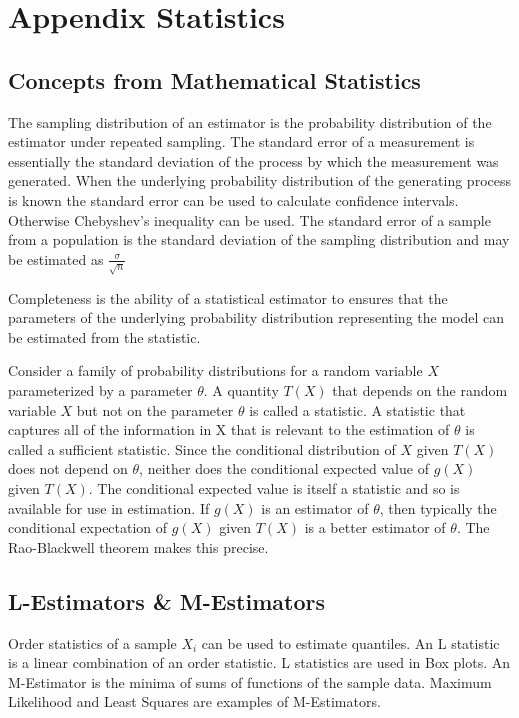 \chapter{Appendix Statistics}

\section*{Concepts from Mathematical Statistics}The sampling distribution of an estimator is the probability distribution of the estimator under repeated sampling.  The standard error of a measurement is essentially the standard deviation of the process by which the measurement was generated.  When the underlying probability distribution of the generating process is known the standard error can be used to calculate confidence intervals.  Otherwise Chebyshev's inequality can be used. The standard error of a sample from a population is the standard deviation of the sampling distribution and may be estimated as $\frac{\sigma}{\sqrt{n}}$

Completeness is the ability of a statistical estimator to ensures that the parameters of the underlying probability distribution representing the model can be estimated from the statistic.

Consider a family of probability distributions for a random variable $X$ parameterized by a parameter $\theta$. A quantity $T(X)$ that depends on the random variable $X$ but not on the parameter $\theta$ is called a statistic.  A statistic that captures all of the information in X that is relevant to the estimation of $\theta$ is called a sufficient statistic. Since the conditional distribution of $X$ given $T(X)$ does not depend on $\theta$, neither does the conditional expected value of $g(X)$ given $T(X)$. The conditional expected value is itself a statistic and so is available for use in estimation. If $g(X)$ is an estimator of $\theta$, then typically the conditional expectation of $g(X)$ given $T(X)$ is a better estimator of $\theta$. The Rao-Blackwell theorem makes this precise.

\section*{L-Estimators \& M-Estimators}Order statistics of a sample ${X_i}$ can be used to estimate quantiles. An L statistic is a linear combination of an order statistic.  L statistics are used in Box plots.  An M-Estimator is the minima of sums of functions of the sample data.  Maximum Likelihood and Least Squares are examples of M-Estimators.

